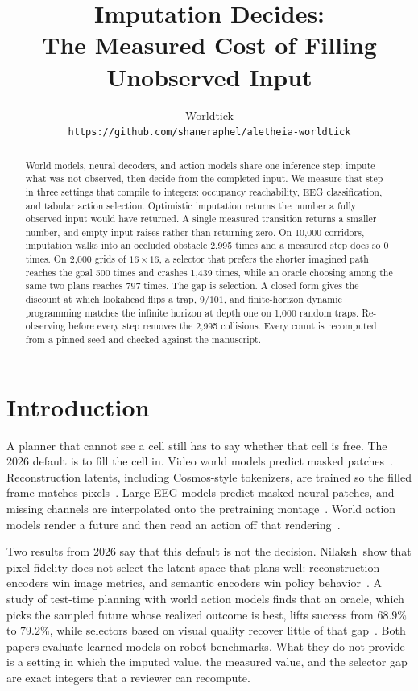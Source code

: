 \documentclass[10pt,twocolumn,letterpaper]{article}
\title{Imputation Decides:\\The Measured Cost of Filling Unobserved Input}
\author{Worldtick\\
{\tt\small https://github.com/shaneraphel/aletheia-worldtick}
}
\begin{document}
\maketitle

\begin{abstract}
World models, neural decoders, and action models share one inference step: impute what was not observed, then decide from the completed input.
We measure that step in three settings that compile to integers: occupancy reachability, EEG classification, and tabular action selection.
Optimistic imputation returns the number a fully observed input would have returned.
A single measured transition returns a smaller number, and empty input raises rather than returning zero.
On 10{,}000 corridors, imputation walks into an occluded obstacle 2{,}995 times and a measured step does so 0 times.
On 2{,}000 grids of $16{\times}16$, a selector that prefers the shorter imagined path reaches the goal 500 times and crashes 1{,}439 times, while an oracle choosing among the same two plans reaches 797 times.
The gap is selection.
A closed form gives the discount at which lookahead flips a trap, $9/101$, and finite-horizon dynamic programming matches the infinite horizon at depth one on 1{,}000 random traps.
Re-observing before every step removes the 2{,}995 collisions.
Every count is recomputed from a pinned seed and checked against the manuscript.
\end{abstract}

\section{Introduction}
\label{sec:intro}

A planner that cannot see a cell still has to say whether that cell is free.
The 2026 default is to fill the cell in.
Video world models predict masked patches~\cite{vjepa21,vjepa2}.
Reconstruction latents, including Cosmos-style tokenizers, are trained so the filled frame matches pixels~\cite{nilaksh2026}.
Large EEG models predict masked neural patches, and missing channels are interpolated onto the pretraining montage~\cite{jiang2024labram}.
World action models render a future and then read an action off that rendering~\cite{visual2026,wcd2026}.

Two results from 2026 say that this default is not the decision.
Nilaksh~\etal show that pixel fidelity does not select the latent space that plans well: reconstruction encoders win image metrics, and semantic encoders win policy behavior~\cite{nilaksh2026}.
A study of test-time planning with world action models finds that an oracle, which picks the sampled future whose realized outcome is best, lifts success from $68.9\%$ to $79.2\%$, while selectors based on visual quality recover little of that gap~\cite{visual2026}.
Both papers evaluate learned models on robot benchmarks.
What they do not provide is a setting in which the imputed value, the measured value, and the selector gap are exact integers that a reviewer can recompute.
\end{document}

